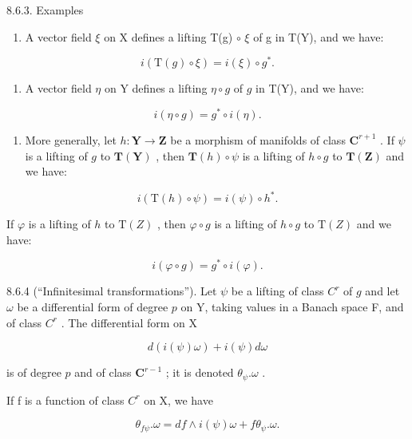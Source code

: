 8.6.3. Examples

\begin{enumerate}
\def\labelenumi{\alph{enumi})}
\tightlist
\item
  A vector field \(\xi\) on X defines a lifting T(g) \(\circ\) \(\xi\) of g in T(Y), and we have:
\end{enumerate}

\[
i (\mathrm{T} (g) \circ \xi) = i (\xi) \circ g ^ {*}.\tag{3}
\]

\begin{enumerate}
\def\labelenumi{\alph{enumi})}
\setcounter{enumi}{1}
\tightlist
\item
  A vector field \(\eta\) on Y defines a lifting \(\eta \circ g\) of \(g\) in T(Y), and we have:
\end{enumerate}

\[
i (\eta \circ g) = g ^ {*} \circ i (\eta).\tag{4}
\]

\begin{enumerate}
\def\labelenumi{\alph{enumi})}
\setcounter{enumi}{2}
\tightlist
\item
  More generally, let \(h: \mathbf{Y} \to \mathbf{Z}\) be a morphism of manifolds of class \(\mathbf{C}^{r+1}\) . If \(\psi\) is a lifting of \(g\) to \(\mathbf{T}(\mathbf{Y})\) , then \(\mathbf{T}(h) \circ \psi\) is a lifting of \(h \circ g\) to \(\mathbf{T}(\mathbf{Z})\) and we have:
\end{enumerate}

\[
i (\mathrm{T} (h) \circ \psi) = i (\psi) \circ h ^ {*}.\tag{5}
\]

If \(\varphi\) is a lifting of \(h\) to \(\mathrm{T}(Z)\) , then \(\varphi \circ g\) is a lifting of \(h \circ g\) to \(\mathrm{T}(Z)\) and we have:

\[
i (\varphi \circ g) = g ^ {*} \circ i (\varphi).\tag{6}
\]

8.6.4 (“Infinitesimal transformations”). Let \(\psi\) be a lifting of class \(C^r\) of \(g\) and let \(\omega\) be a differential form of degree \(p\) on Y, taking values in a Banach space F, and of class \(C^r\) . The differential form on X

\[
d (i (\psi) \omega) + i (\psi) d \omega\tag{7}
\]

is of degree \(p\) and of class \(\mathbf{C}^{r-1}\) ; it is denoted \(\theta_{\psi}.\omega\) .

If f is a function of class \(C^{r}\) on X, we have

\[
\theta_ {f \psi}. \omega = d f \wedge i (\psi) \omega + f \theta_ {\psi}. \omega .\tag{8}
\]

